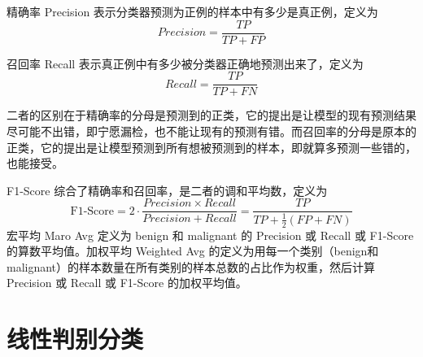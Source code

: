 \documentclass[a4paper,12pt,onecolumn,oneside]{article}
\begin{document}
精确率 Precision 表示分类器预测为正例的样本中有多少是真正例，定义为
\begin{equation*}
	Precision = \frac{TP}{TP + FP}
\end{equation*}
\par 召回率 Recall 表示真正例中有多少被分类器正确地预测出来了，定义为
\begin{equation*}
	Recall = \frac{TP}{TP + FN}
\end{equation*}
\par 二者的区别在于精确率的分母是预测到的正类，它的提出是让模型的现有预测结果尽可能不出错，即宁愿漏检，也不能让现有的预测有错。而召回率的分母是原本的正类，它的提出是让模型预测到所有想被预测到的样本，即就算多预测一些错的，也能接受。\par
F1-Score 综合了精确率和召回率，是二者的调和平均数，定义为
\begin{equation*}
	\text{F1-Score} = 2\cdot\frac{Precision\times Recall}{Precision+Recall} = \frac{TP}{TP+\frac{1}{2}(FP+FN)}
\end{equation*}
宏平均 Maro Avg 定义为 benign 和 malignant 的 Precision 或 Recall 或 F1-Score 的算数平均值。加权平均 Weighted Avg 的定义为用每一个类别（benign和malignant）的样本数量在所有类别的样本总数的占比作为权重，然后计算 Precision 或 Recall 或 F1-Score 的加权平均值。
\clearpage
\section{线性判别分类}
\end{document}
